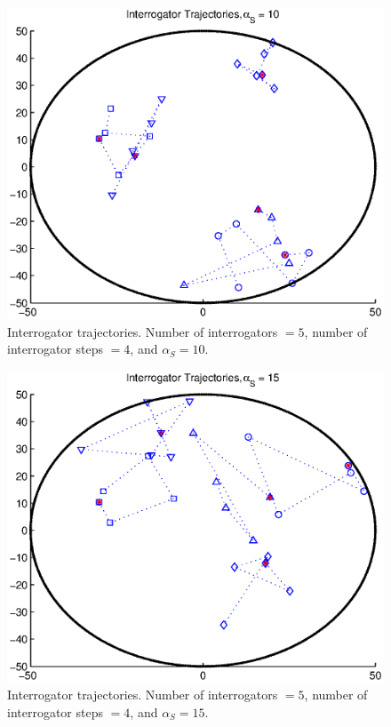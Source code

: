 \begin{figure}
\centering
\includegraphics[width=5in]{Chapter_4_Figures/interrogator_traj_alpha_S_10.eps}
\caption{Interrogator trajectories. Number of interrogators $=5$, number of interrogator steps $=4$, and $\alpha_S = 10$.}
\label{Figure: interrogator_traj_alpha_S_10.eps}
\end{figure}
\begin{figure}
\centering
\includegraphics[width=5in]{Chapter_4_Figures/interrogator_traj_alpha_S_15.eps}
\caption{Interrogator trajectories. Number of interrogators $=5$, number of interrogator steps $=4$, and $\alpha_S = 15$.}
\label{Figure: interrogator_traj_alpha_S_15.eps}
\end{figure}
\clearpage

